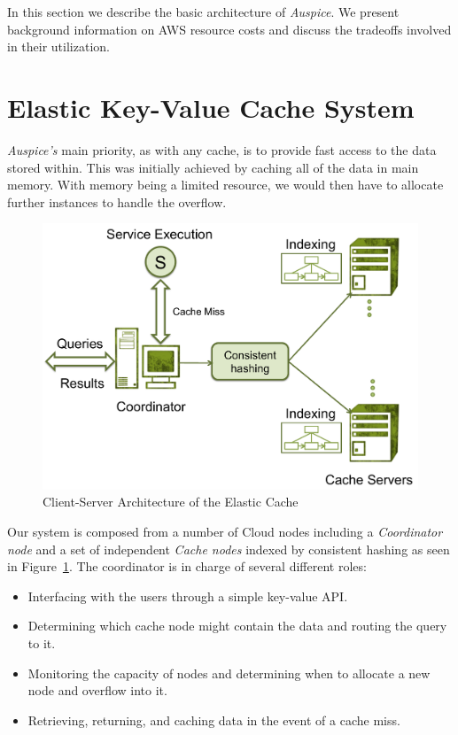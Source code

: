 In this section we describe the basic architecture of \emph{Auspice}. We
present background information on AWS resource costs and discuss the tradeoffs
involved in their utilization.

\section{Elastic Key-Value Cache System} %
\label{sec:Elastic_Key-Value_Cache_System}
\emph{Auspice's} main priority, as with any cache, is to provide fast access to
the data stored within. This was initially achieved by caching all of the data
in main memory. With memory being a limited resource, we would then have to
allocate further instances to handle the overflow.

\begin{figure}
\begin{center}
\includegraphics[scale=0.5]{figures/arch.pdf}
\end{center}
\caption{Client-Server Architecture of the Elastic Cache}
\label{fig:architecture}
\end{figure}

Our system is composed from a number of Cloud nodes including a
\emph{Coordinator node} and a set of independent \emph{Cache nodes} indexed by
consistent hashing as seen in Figure~\ref{fig:architecture}. The coordinator is
in charge of several different roles:
\begin{itemize}
	\item Interfacing with the users through a simple key-value API.
	\item Determining which cache node might contain the data and routing the
		query to it.
	\item Monitoring the capacity of nodes and determining when to allocate a new
		node and overflow into it.
	\item Retrieving, returning, and caching data in the event of a cache miss.
\end{itemize}

